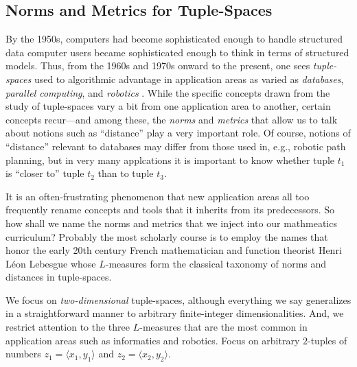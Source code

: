 \subsection{Norms and Metrics for Tuple-Spaces}
\label{sec:Ln-norms}

By the 1950s, computers had become sophisticated enough to handle
structured data computer users became sophisticated enough to think in
terms of structured models.  Thus, from the 1960s and 1970s onward to
the present, one sees {\it tuple-spaces}  used to
algorithmic advantage in application areas as varied as {\it
  databases}, \cite{Codd70} {\it parallel computing},
\cite{BlumS77,Shinahr74} and {\it robotics}
\cite{Marchese96,Rosenberg12}.  While the specific concepts drawn from
the study of tuple-spaces vary a bit from one application area to
another, certain concepts recur---and among these, the {\it norms} and
{\it metrics} that allow us to talk about notions such as ``distance''
play a very important role.  Of course, notions of ``distance''
relevant to databases may differ from those used in, e.g., robotic
path planning, but in very many applcations it is important to know
whether tuple $t_1$ is ``closer to'' tuple $t_2$ than to tuple $t_3$.

It is an often-frustrating phenomenon that new application areas all
too frequently rename concepts and tools that it inherits from its
predecessors.  So how shall we name the norms and metrics that we
inject into our mathmeatics curriculum?  Probably the most scholarly
course is to employ the names that honor the early 20th century French
mathematician and function theorist Henri L\'{e}on Lebesgue
 whose $L$-measures
 form the classical taxonomy of norms
and distances in tuple-spaces.

We focus on {\em two-dimensional} tuple-spaces, although everything we
say generalizes in a straightforward manner to arbitrary
finite-integer dimensionalities.  And, we restrict attention to the
three $L$-measures that are the most common in application areas such
as informatics and robotics.  Focus on arbitrary $2$-tuples of numbers
$z_1 = \langle x_1, y_1 \rangle$ and $z_2 = \langle x_2, y_2 \rangle$.

\medskip

